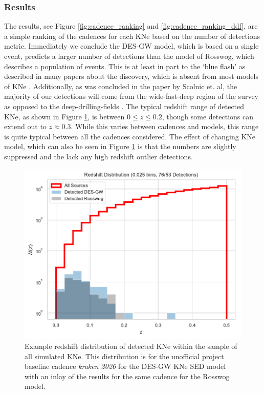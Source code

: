 \subsubsection{Results}
The results, see Figure \ref{fig:cadence_ranking} and \ref{fig:cadence_ranking_ddf}, are a simple ranking of the cadences for each KNe based on the number of detections metric. Immediately we conclude the DES-GW model, which is based on a single event, predicts a larger number of detections than the model of Rosswog, which describes a population of events. This is at least in part to the `blue flash' as described in many papers about the discovery, which is absent from most models of KNe \citep{Villar2017b}. Additionally, as was concluded in the paper by Scolnic et. al, the majority of our detections will come from the wide-fast-deep region of the survey as opposed to the deep-drilling-fields \citep{Scolnic2017a}. The typical redshift range of detected KNe, as shown in Figure \ref{fig:typical_nz}, is between $0 \leq z \leq 0.2$, though some detections can extend out to $z \approx 0.3$. While this varies between cadences and models, this range is quite typical between all the cadences considered. The effect of changing KNe model, which can also be seen in Figure \ref{fig:typical_nz} is that the numbers are slightly suppressed and the lack any high redshift outlier detections.\par

\begin{figure}[h!]
  \centering
  \includegraphics[scale=1.0]{figures/both_nz_base_kraken_2026}
  \caption{Example redshift distribution of detected KNe within the sample of all simulated KNe. This distribution is for the unofficial project baseline cadence \protect \textit{kraken 2026} for the DES-GW KNe SED model with an inlay of the results for the same cadence for the Rosswog model.}
  \label{fig:typical_nz}
\end{figure}

